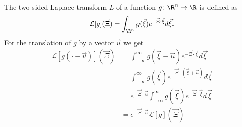 
The two sided Laplace transform $L$ of a function $g\colon \R^n \mapsto \R$ is defined as
\begin{equation}
  \label{eq: Definition of Laplace}
  \mathcal{L}[g](\vec{\Xi}) = \int_{\R^n} g(\vec{\xi}) e^{-\vec{\Xi} \cdot \vec{\xi}}d\vec{\xi}.
\end{equation}
For the translation of $g$ by a vector $\vec{u}$ we get
\begin{equation}
  \label{eq: translated laplace}
  \begin{aligned}
    \mathcal{L}[g(\cdot - \vec{u})](\vec{\Xi})
    & = \int_{-\infty}^\infty g(\vec{\xi}-\vec{u}) e^{-\vec{\Xi} \cdot \vec{\xi}}d\vec{\xi} \\
    & = \int_{-\infty}^\infty g(\vec{\xi}) e^{-\vec{\Xi} \cdot (\vec{\xi}+\vec{u})}d\vec{\xi} \\
    & =  e^{-\vec{\Xi} \cdot \vec{u}} \int_{-\infty}^\infty g(\vec{\xi}) e^{-\vec{\Xi} \cdot \vec{\xi}}d\vec{\xi} \\
    & =  e^{-\vec{\Xi} \cdot \vec{u}} \mathcal{L}[g](\vec{\Xi})
  \end{aligned}
\end{equation}
